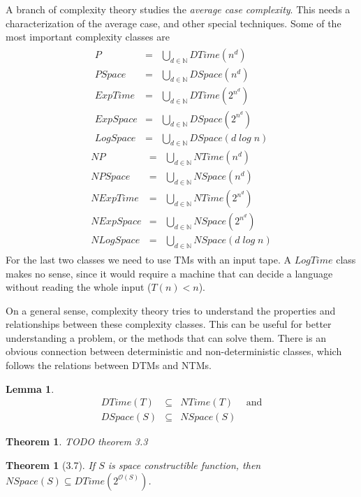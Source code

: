 \documentclass{report}
\newcommand{\NSpace}{\text{$\mathit{NSpace}$}\xspace}
\newcommand{\DTime}{\text{$\mathit{DTime}$}\xspace}
\newcommand{\bigO}{\text{$\mathcal{O}$}\xspace}
\newtheorem{theorem}[definition]{Theorem}
\newtheorem{lemma}[definition]{Lemma}
\begin{document}
A branch of complexity theory studies the \textit{average case complexity}. This needs a characterization of the average case, and other special techniques. Some of the most important complexity classes are
\[
\begin{array}{c}
	\begin{array}{rll}
		P &= &\bigcup_{d\in\mathbb{N}}DTime(n^d)\\
		PSpace &= &\bigcup_{d\in\mathbb{N}}DSpace(n^d)\\
		ExpTime &= &\bigcup_{d\in\mathbb{N}}DTime(2^{n^d})\\
		ExpSpace &= &\bigcup_{d\in\mathbb{N}}DSpace(2^{n^d})\\
		LogSpace &= &\bigcup_{d\in\mathbb{N}}DSpace(d\;log\;n)
	\end{array}
	\begin{array}{rll}
		NP &= &\bigcup_{d\in\mathbb{N}}NTime(n^d)\\
		NPSpace &= &\bigcup_{d\in\mathbb{N}}NSpace(n^d)\\
		NExpTime &= &\bigcup_{d\in\mathbb{N}}NTime(2^{n^d})\\
		NExpSpace &= &\bigcup_{d\in\mathbb{N}}NSpace(2^{n^d})\\
		NLogSpace &= &\bigcup_{d\in\mathbb{N}}NSpace(d\;log\;n)
	\end{array}
\end{array}
\]
For the last two classes we need to use TMs with an input tape. A $LogTime$ class makes no sense, since it would require a machine that can decide a language without reading the whole input ($T(n) < n$).

On a general sense, complexity theory tries to understand the properties and relationships between these complexity classes. This can be useful for better understanding a problem, or the methods that can solve them. There is an obvious connection between deterministic and non-deterministic classes, which follows the relations between DTMs and NTMs.

\begin{lemma}
\[
\begin{array}{rll}
	DTime(T) &\subseteq &NTime(T)\quad\text{ and}\\
	DSpace(S) &\subseteq &NSpace(S)
\end{array}
\]
\end{lemma}

\begin{theorem}TODO theorem 3.3
\end{theorem}

\begin{theorem}[3.7]If $S$ is space constructible function, then $\NSpace(S) \subseteq \DTime(2^{\bigO(S)})$.
\end{theorem}
\end{document}
